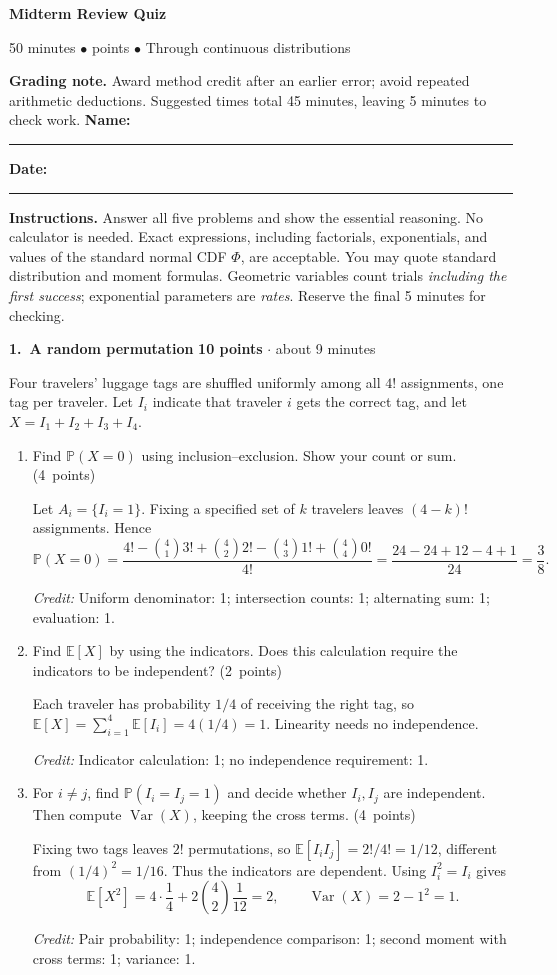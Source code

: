 \documentclass[11pt,letterpaper]{article}
\newcommand{\Prob}{\mathbb P}
\newcommand{\E}{\mathbb E}
\DeclareMathOperator{\Var}{Var}
\newcommand{\partpts}[1]{\unskip\nobreak\hspace{.3em}%
  \mbox{\small\color{muted}(#1 points)}}
\newcommand{\credit}[1]{\par{\footnotesize\color{muted}\textit{Credit:} #1}}
\newcommand{\problem}[4]{\par\addvspace{8pt}%
  {\large\bfseries\color{indigo}#1.\ #2}\hfill
  {\small\color{muted}\textbf{#3 points} $\cdot$ about #4 minutes}\par\nobreak}
\begin{document}
{\LARGE\bfseries\color{indigo}Midterm Review Quiz}\par
{\small\color{muted}50 minutes \quad $\bullet$  points
  \quad $\bullet$ \quad Through continuous distributions}\par
\ifanswers
\textbf{Grading note.} Award method credit after an earlier error;
avoid repeated arithmetic deductions. Suggested times total 45 minutes,
leaving 5 minutes to check work.
\else
\smallskip
\textbf{Name:}\ \rule{.49\linewidth}{.4pt}\hfill
\textbf{Date:}\ \rule{.20\linewidth}{.4pt}\par
\fi
\textbf{Instructions.} Answer all five problems and show the essential
reasoning. No calculator is needed. Exact expressions, including factorials,
exponentials, and values of the standard normal CDF $\Phi$, are acceptable.
You may quote standard distribution and moment formulas. Geometric variables
count trials \emph{including the first success}; exponential parameters
are \emph{rates}. Reserve the final 5 minutes for checking.

\problem{1}{A random permutation}{10}{9}
Four travelers' luggage tags are shuffled uniformly among all $4!$
assignments, one tag per traveler. Let $I_i$ indicate that traveler $i$
gets the correct tag, and let $X=I_1+I_2+I_3+I_4$.
\begin{enumerate}
\item Find $\Prob(X=0)$ using inclusion--exclusion. Show your count or sum.
\partpts{4}
\begin{solution}[.9in]
Let $A_i=\{I_i=1\}$. Fixing a specified set of $k$ travelers leaves
$(4-k)!$ assignments. Hence
\[
\Prob(X=0)=\frac{4!-\binom41 3!+\binom42 2!-\binom43 1!+\binom44 0!}{4!}
=\frac{24-24+12-4+1}{24}=\frac38.
\]
\credit{Uniform denominator: 1; intersection counts: 1; alternating sum: 1;
evaluation: 1.}
\end{solution}
\item Find $\E[X]$ by using the indicators. Does this calculation
require the indicators to be independent? \partpts{2}
\begin{solution}[.65in]
Each traveler has probability $1/4$ of receiving the right tag, so
$\E[X]=\sum_{i=1}^4\E[I_i]=4(1/4)=1$. Linearity needs no independence.
\credit{Indicator calculation: 1; no independence requirement: 1.}
\end{solution}
\item For $i\ne j$, find $\Prob(I_i=I_j=1)$ and decide whether $I_i,I_j$
are independent. Then compute $\Var(X)$, keeping the cross terms.
\partpts{4}
\begin{solution}[1.05in]
Fixing two tags leaves $2!$ permutations, so
$\E[I_iI_j]=2!/4!=1/12$, different from $(1/4)^2=1/16$.
Thus the indicators are dependent. Using $I_i^2=I_i$ gives
\[
\E[X^2]=4\cdot\frac14+2\binom42\frac1{12}=2,
\qquad \Var(X)=2-1^2=1.
\]
\credit{Pair probability: 1; independence comparison: 1;
second moment with cross terms: 1; variance: 1.}
\end{solution}
\end{enumerate}
\end{document}
